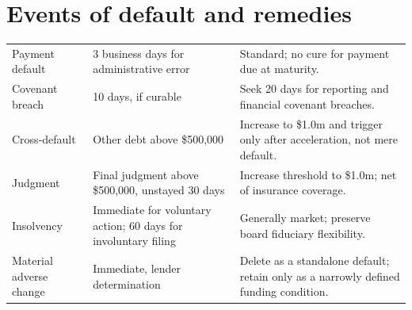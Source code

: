 \section{Events of default and remedies}

\begin{tabularx}{\textwidth}{@{}L{0.22\textwidth}L{0.25\textwidth}Y@{}}
\toprule
{}
 &  &  \\
\midrule
Payment default & 3 business days for administrative error & Standard; no cure for payment due at maturity. \\
Covenant breach & 10 days, if curable & Seek 20 days for reporting and financial covenant breaches. \\
Cross-default & Other debt above \$500,000 & Increase to \$1.0m and trigger only after acceleration, not mere default. \\
Judgment & Final judgment above \$500,000, unstayed 30 days & Increase threshold to \$1.0m; net of insurance coverage. \\
Insolvency & Immediate for voluntary action; 60 days for involuntary filing & Generally market; preserve board fiduciary flexibility. \\
Material adverse change & Immediate, lender determination & Delete as a standalone default; retain only as a narrowly defined funding condition. \\
\bottomrule
\end{tabularx}
